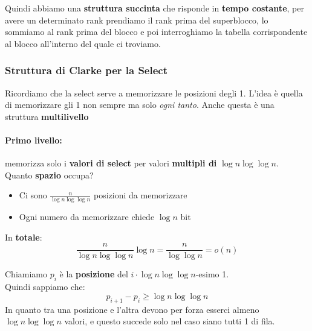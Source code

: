 Quindi abbiamo una \textbf{struttura succinta} che risponde in \textbf{tempo costante}, per avere un determinato rank prendiamo il rank prima del superblocco, lo sommiamo al rank prima del blocco e poi interroghiamo la tabella corrispondente al blocco all'interno del quale ci troviamo.\\


\newpage

\subsubsection{Struttura di Clarke per la Select}

Ricordiamo che la select serve a memorizzare le posizioni degli 1. L'idea è quella di memorizzare gli 1 non sempre ma solo \textit{ogni tanto}. Anche questa è una struttura \textbf{multilivello}\\

\paragraph{Primo livello:} memorizza solo i \textbf{valori di select} per valori \textbf{multipli di} $\log n \log \log n$.\\

Quanto \textbf{spazio} occupa? 
\begin{itemize}
	\item Ci sono $\frac{n}{\log n \log \log n}$ posizioni da memorizzare
	\item Ogni numero da memorizzare chiede $\log n$ bit
\end{itemize}

In \textbf{totale}: 
$$ \frac{n}{ \log n \log \log n} \log n = \frac{n}{\log \log n} = o(n) $$

Chiamiamo $p_i$ è la \textbf{posizione} del $i \cdot \log n \log \log n$-esimo 1.\\
Quindi sappiamo che:
$$ p_{i+1} - p_i \geq \log n \log \log n $$
In quanto tra una posizione e l'altra devono per forza esserci almeno $\log n \log \log n$ valori, e questo succede solo nel caso siano tutti 1 di fila.\\

\newpage


